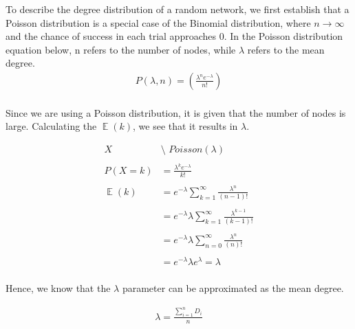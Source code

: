 \documentclass[journal]{IEEEtran}
\DeclareMathOperator{\EX}{\mathbb{E}}%
\begin{document}
\noindent To describe the degree distribution of a random network, we first establish that a Poisson distribution is a special case of the Binomial distribution, where $n \rightarrow \infty$ and the chance of success in each trial approaches 0. In the Poisson distribution equation below, n refers to the number of nodes, while $\lambda$ refers to the mean degree.\\

\begin{equation}
    \begin{split}
        P(\lambda, n) = (\frac{\lambda^n e^{-\lambda}}{n!})
    \end{split}
    \label{eq:poisson_distribution}
\end{equation}
\\

\noindent Since we are using a Poisson distribution, it is given that the number of nodes is large. Calculating the $\EX(k)$, we see that it results in $\lambda$. 

\begin{equation}
    \begin{split}
        X &\texttt{\char`\~} Poisson(\lambda) \\
        \\
        P(X=k) &= \frac{\lambda^k e^{-\lambda}}{k!} \\
        \\
        \EX(k) &= e^{-\lambda}\sum_{k=1}^{\infty} \frac{\lambda^n}{(n-1)!}\\
        \\
        &= e^{-\lambda}\lambda\sum_{k=1}^{\infty} \frac{\lambda^{k-1}}{(k-1)!}\\
        \\
        &= e^{-\lambda}\lambda\sum_{n=0}^{\infty} \frac{\lambda^{n}}{(n)!}\\
        \\
        &= e^{-\lambda}\lambda e^{\lambda} = \lambda\\
    \end{split}
    \label{eq:mutual}
\end{equation}

\noindent Hence, we know that the $\lambda$ parameter can be approximated as the mean degree.

\begin{equation}
    \begin{split}
        \lambda = \frac{\sum_{i=1}^{n}D_i}{n}
    \end{split}
    \label{eq:poisson_distribution}
\end{equation}
\end{document}

